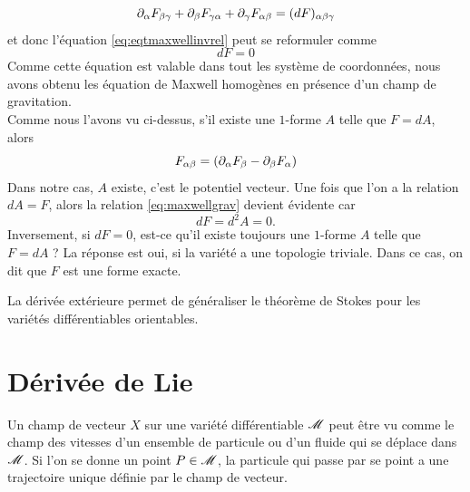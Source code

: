 \documentclass[a4paper,11pt]{report}
\begin{document}
\begin{exmp}
                \begin{equation}
                    \partial_\alpha F_{\beta\gamma}+\partial_\beta F_{\gamma\alpha}+\partial_\gamma F_{\alpha\beta} = (dF)_{\alpha\beta\gamma}
                \end{equation}
                et donc l'équation \ref{eq:eqtmaxwellinvrel} peut se reformuler comme
                \begin{equation}\label{eq:maxwellgrav}
                    dF = 0
                \end{equation}
                Comme cette équation est valable dans tout les système de coordonnées, nous avons obtenu les équation de Maxwell homogènes en présence d'un champ de gravitation.\\
                
                Comme nous l'avons vu ci-dessus, s'il existe une $1$-forme $A$ telle que $F = dA$, alors
                \begin{equation}
                    F_{\alpha\beta} = (\partial_\alpha F_\beta-\partial_\beta F_\alpha)
                \end{equation}
                Dans notre cas, $A$ existe, c'est le potentiel vecteur. Une fois que l'on a la relation $dA = F$, alors la relation \ref{eq:maxwellgrav} devient évidente car
                \begin{equation}
                    dF = d^2A = 0.
                \end{equation}
                Inversement, si $dF = 0$, est-ce qu'il existe toujours une $1$-forme $A$ telle que $F = dA$ ? La réponse est oui, si la variété a une topologie triviale. Dans ce cas, on dit que $F$ est une forme exacte.
            \end{exmp}
            
            La dérivée extérieure permet de généraliser le théorème de Stokes pour les variétés différentiables orientables.
            
        \section{Dérivée de Lie}
            
            Un champ de vecteur $X$ sur une variété différentiable $\mathscr{M}$ peut être vu comme le champ des vitesses d'un ensemble de particule ou d'un fluide qui se déplace dans $\mathscr{M}$. Si l'on se donne un point $P\in\mathscr{M}$, la particule qui passe par se point a une trajectoire unique définie par le champ de vecteur.
            
\end{document}
